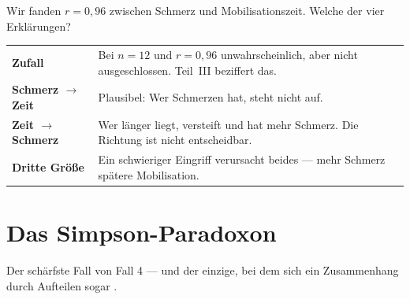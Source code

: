 \begin{merksatz}
Wir fanden $r = 0{,}96$ zwischen Schmerz und Mobilisationszeit. Welche der vier Erklärungen?

\begin{center}
{\small
\renewcommand{\arraystretch}{1.5}
\begin{tabular}{@{}P{2.2cm}P{6.2cm}@{}}
\toprule
\textbf{Zufall} & Bei $n=12$ und $r = 0{,}96$ unwahrscheinlich, aber nicht ausgeschlossen. Teil~III beziffert das.\\
\textbf{Schmerz $\to$ Zeit} & Plausibel: Wer Schmerzen hat, steht nicht auf.\\
\textbf{Zeit $\to$ Schmerz} &  Wer länger liegt, versteift und hat mehr Schmerz. Die Richtung ist nicht entscheidbar.\\
\textbf{Dritte Größe} & Ein schwieriger Eingriff verursacht beides --- mehr Schmerz  spätere Mobilisation.\\
\bottomrule
\end{tabular}}
\end{center}

\begin{center}
\begin{minipage}{0.88\textwidth}
\end{minipage}
\end{center}
\end{merksatz}

\section{Das Simpson-Paradoxon}

Der schärfste Fall von Fall 4 --- und der einzige, bei dem sich ein Zusammenhang durch Aufteilen sogar .


